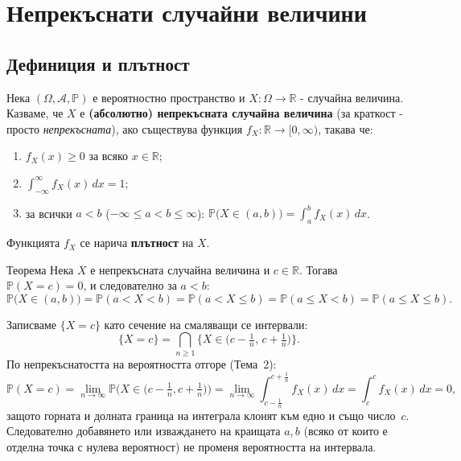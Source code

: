 \chapter{Непрекъснати случайни величини}

\section{Дефиниция и плътност}

\begin{defbox}
Нека $(\Omega,\mathcal A,\mathbb P)$ е вероятностно пространство и
$X:\Omega\to\mathbb R$ - случайна величина. Казваме, че $X$ е
\textbf{(абсолютно) непрекъсната случайна величина} (за краткост -
просто \emph{непрекъсната}), ако съществува функция
$f_X:\mathbb R\to[0,\infty)$, такава че:
\begin{enumerate}[label=\arabic*)]
  \item $f_X(x)\ge0$ за всяко $x\in\mathbb R$;
  \item $\displaystyle\int_{-\infty}^{\infty} f_X(x)\,dx = 1$;
  \item за всички $a<b$ ($-\infty\le a<b\le\infty$): $\displaystyle
  \mathbb P\big(X\in(a,b)\big) = \int_a^b f_X(x)\,dx$.
\end{enumerate}
Функцията $f_X$ се нарича \textbf{плътност} на $X$.
\end{defbox}

\begin{thmbox}[]{Теорема}
Нека $X$ е непрекъсната случайна величина и $c\in\mathbb R$. Тогава
$\mathbb P(X=c)=0$, и следователно за $a<b$:
\[
  \mathbb P\big(X\in(a,b)\big) = \mathbb P(a<X<b) = \mathbb P(a<X\le b) = \mathbb P(a\le X<b) = \mathbb P(a\le X\le b).
\]
\end{thmbox}

\begin{proofbox}
Записваме $\{X=c\}$ като сечение на смаляващи се интервали:
\[
  \{X=c\} = \bigcap_{n\ge1} \Big\{X\in\big(c-\tfrac1n,\,c+\tfrac1n\big)\Big\}.
\]
По непрекъснатостта на вероятността отгоре (Тема~2):
\[
  \mathbb P(X=c) = \lim_{n\to\infty} \mathbb P\Big(X\in\big(c-\tfrac1n,c+\tfrac1n\big)\Big) = \lim_{n\to\infty}\int_{c-\frac1n}^{c+\frac1n} f_X(x)\,dx = \int_c^c f_X(x)\,dx = 0,
\]
защото горната и долната граница на интеграла клонят към едно и
също число~$c$. Следователно добавянето или изваждането на краищата
$a,b$ (всяко от които е отделна точка с нулева вероятност) не
променя вероятността на интервала. \qedbg
\end{proofbox}

